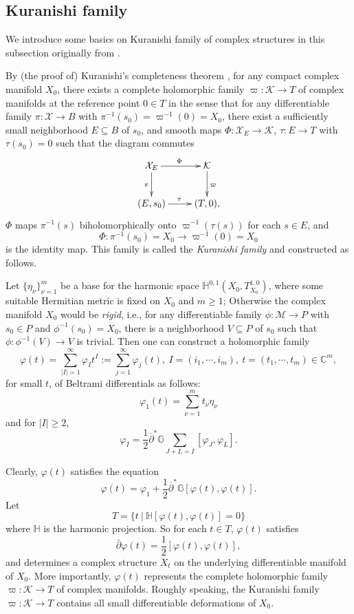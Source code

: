 \documentclass[12pt]{amsart}
\numberwithin{equation}{section}
\theoremstyle{definition}
\theoremstyle{definition}
\theoremstyle{definition}
\renewcommand{\1}{\mathsf{1}}
\newcommand{\G}{\mathbb{G}}
\newcommand{\db}{\overline{\partial}}
\renewcommand{\>}{\rightarrow}
\newcommand{\p}{\partial}
\def\p{\partial}
\def\b{\bar}
\def\mc{\mathcal}
\theoremstyle{plain} %
\theoremstyle{plain} %
\theoremstyle{plain} %
\begin{document}
	\subsection{Kuranishi family}\label{subsection-Kuranishi family}
	We introduce some basics on Kuranishi family of complex structures in this subsection originally from \cite{Ku64}.
	
	By (the proof of) Kuranishi's completeness theorem \cite{Ku64}, for any compact complex manifold $X_0$, there exists a complete holomorphic family
	$\varpi:\mc{K}\rightarrow T$ of complex manifolds at the reference point $0\in T$ in the sense that for any differentiable family $\pi:\mc{X}\rightarrow B$ with $\pi^{-1}(s_0)=\varpi^{-1}(0)=X_0$, there exist a sufficiently small neighborhood $E\subseteq B$ of $s_0$, and smooth maps $\Phi: \mathcal {X}_E\rightarrow \mathcal {K}$,  $\tau: E\rightarrow T$ with $\tau(s_0)=0$ such that the diagram commutes
	$$\xymatrix{\mathcal {X}_E \ar[r]^{\Phi}\ar[d]_\pi& \mathcal {K}\ar[d]^\varpi\\
		(E,s_0)\ar[r]^{\tau}  & (T,0),}$$
	$\Phi$ maps $\pi^{-1}(s)$ biholomorphically onto $\varpi^{-1}(\tau(s))$ for each $s\in E$, and $$\Phi: \pi^{-1}(s_0)=X_0\longrightarrow \varpi^{-1}(0)=X_0$$ is the identity map.
This family is called the \textit{Kuranishi family} and constructed as follows. 
    
    Let $\{\eta_\nu\}_{\nu=1}^m$ be a  base for the harmonic space $\mathbb{H}^{0,1}(X_0,T^{1,0}_{X_0})$, where some suitable Hermitian metric is fixed on $X_0$ and $m\geq 1$; Otherwise the complex manifold $X_0$ would be  \textit{rigid}, i.e., for any differentiable family $\phi:\mc{M}\to P$ with $s_0\in P$ and $\phi^{-1}(s_0)=X_0$, there is a neighborhood $V \subseteq P$ of $s_0$ such that $\phi:\phi^{-1}(V)\to V$ is trivial. Then one can construct a holomorphic family
	$$\label{phi-ps-pp}\varphi(t) = \sum_{|I|=1}^{\infty}\varphi_{I}t^I:=\sum_{j=1}^{\infty}\varphi_j(t),\ I=(i_1,\cdots,i_m),\ t=(t_1,\cdots,t_m)\in \mathbb{C}^m,$$ {for small $t$,} of Beltrami differentials as follows:
	$$\label{phi-ps-0}
	\varphi_1(t)=\sum_{\nu=1}^{m}t_\nu\eta_\nu
	$$
	and for $|I|\geq 2$,
	$$\label{phi-ps}
	\varphi_I=\frac{1}{2}\db^*\G\sum_{J+L=I}[\varphi_J,\varphi_{L}].
	$$
	
Clearly, $\varphi(t)$ satisfies the equation
	$$\varphi(t)=\varphi_1+\frac{1}{2}\db^*\G[\varphi(t),\varphi(t)].$$
	Let
	$$T=\{t\ |\ \mathbb{H}[\varphi(t),\varphi(t)]=0 \}$$
	where $\mathbb H$ is the harmonic projection.
	So for each $t\in T$, $\varphi(t)$ satisfies
	\begin{equation}\label{int}
		\b{\p}\varphi(t)=\frac{1}{2}[\varphi(t),\varphi(t)],
	\end{equation}
	and determines a complex structure $X_t$ on the underlying differentiable manifold of $X_0$. More importantly, $\varphi(t)$ represents the complete holomorphic family $\varpi:\mc{K}\rightarrow T$ of complex manifolds. Roughly speaking, the Kuranishi family $\varpi:\mc{K}\rightarrow T$ contains all small differentiable deformations of $X_0$.
	
\end{document}
